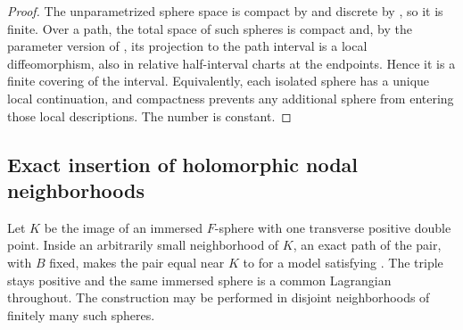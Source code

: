 \begin{proof}
The unparametrized sphere space is compact by
 and discrete by
, so it is finite.  Over a path, the total
space of such spheres is compact and, by the parameter version of
, its projection to the path interval is a
local diffeomorphism, also in relative half-interval charts at the
endpoints.  Hence it is a finite covering of the interval.  Equivalently,
each isolated sphere has a unique local continuation, and compactness
prevents any additional sphere from entering those local descriptions.
The number is constant.
\end{proof}

\subsection{Exact insertion of holomorphic nodal neighborhoods}

\begin{lemma}
\label{lem:pencil-insertion}
Let $K$ be the image of an immersed $F$-sphere with one transverse
positive double point.  Inside an arbitrarily small neighborhood of
$K$, an exact path of the pair, with $B$ fixed, makes the pair equal
near $K$ to  for a model satisfying
.  The triple stays positive and the
same immersed sphere is a common Lagrangian throughout.  The
construction may be performed in disjoint neighborhoods of finitely
many such spheres.
\end{lemma}

